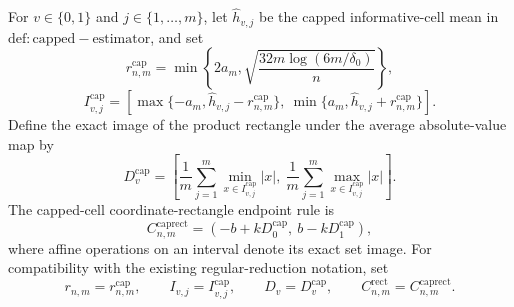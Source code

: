 For \(v\in\{0,1\}\) and \(j\in\{1,\ldots,m\}\), let \(\widehat h_{v,j}\) be the capped informative-cell mean in \(\mathrm{def:capped-estimator}\), and set
\[
 r^{\mathrm{cap}}_{n,m}
 =\min\left\{2a_m,\sqrt{\frac{32m\log(6m/\delta_0)}{n}}\right\},
\]
\[
 I^{\mathrm{cap}}_{v,j}
 =\left[
 \max\{-a_m,\widehat h_{v,j}-r^{\mathrm{cap}}_{n,m}\},
 \ \min\{a_m,\widehat h_{v,j}+r^{\mathrm{cap}}_{n,m}\}
 \right].
\]
Define the exact image of the product rectangle under the average absolute-value map by
\[
 D^{\mathrm{cap}}_v
 =\left[
 \frac1m\sum_{j=1}^{m}\min_{x\in I^{\mathrm{cap}}_{v,j}}|x|,
 \ \frac1m\sum_{j=1}^{m}\max_{x\in I^{\mathrm{cap}}_{v,j}}|x|
 \right].
\]
The capped-cell coordinate-rectangle endpoint rule is
\[
 C^{\mathrm{caprect}}_{n,m}
 =\left(-b+kD^{\mathrm{cap}}_0,\ b-kD^{\mathrm{cap}}_1\right),
\]
where affine operations on an interval denote its exact set image. For compatibility with the existing regular-reduction notation, set
\[
 r_{n,m}=r^{\mathrm{cap}}_{n,m},\qquad
 I_{v,j}=I^{\mathrm{cap}}_{v,j},\qquad
 D_v=D^{\mathrm{cap}}_v,\qquad
 C^{\mathrm{rect}}_{n,m}=C^{\mathrm{caprect}}_{n,m}.
\]


